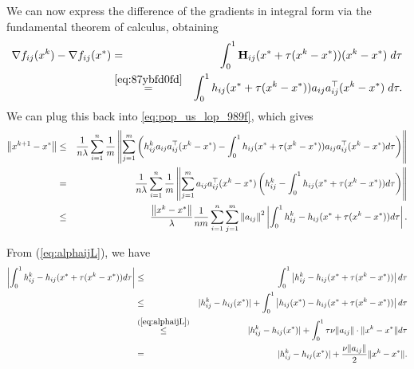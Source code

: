 \documentclass[12pt]{article}
\newcommand{\norm}[1]{\left\|#1\right\|}
\newcommand{\mH}{\mathbf{H}}
\begin{document}
We can now express the difference of the gradients in integral form via the fundamental theorem of calculus, obtaining 
\begin{eqnarray*} \nabla f_{ij}(x^k) - \nabla f_{ij}(x^*) &=&   \int_{0}^1 \mH_{ij} (x^* + \tau(x^k - x^*)) (x^k - x^*) \; d\tau \\
&\overset{\eqref{eq:87ybfd0fd}}{=} & \int_{0}^1 h_{ij}(x^* + \tau(x^k - x^*)) a_{ij}a_{ij}^\top  (x^k - x^*)\; d\tau .\end{eqnarray*}
We can plug this back into \eqref{eq:pop_us_lop_989f}, which gives
\begin{eqnarray}	
\norm{ x^{k+1} - x^* }	&\leq & 
 \frac{1}{n \lambda} \sum_{i=1}^n \frac{1}{m} \norm{  \sum_{j=1}^{m} \left(  h_{ij}^k a_{ij}a_{ij}^\top (x^k - x^*)  -  \int_{0}^1 h_{ij} (x^* + \tau(x^k - x^*))a_{ij}a_{ij}^\top (x^k - x^*)d\tau  \right)   } \notag \\ 
	&=& \frac{1}{n \lambda} \sum_{i=1}^n \frac{1}{m} \norm{  \sum_{j=1}^{m}  a_{ij}a_{ij}^\top (x^k - x^*) \left( h_{ij}^k - \int_{0}^1 h_{ij}(x^* + \tau(x^k - x^*))  d\tau \right) }\notag \\ 
	&\leq& \frac{ \norm{x^k - x^*}}{ \lambda} \frac{1}{nm} \sum_{i=1}^n \sum_{j=1}^{m} \norm{a_{ij}}^2 \left|   \int_{0}^1 h_{ij}^k - h_{ij}(x^* + \tau(x^k - x^*))  d\tau  \right|. \label{petrol-09809fd}
\end{eqnarray}

From (\ref{eq:alphaijL}), we have 
\begin{eqnarray}
	\left|   \int_{0}^1 h_{ij}^k - h_{ij}(x^* + \tau(x^k - x^*))  d\tau  \right| &\leq& \int_{0}^1 \left|  h_{ij}^k - h_{ij}(x^* + \tau(x^k - x^*))   \right| d\tau \notag \\
	&\leq& |h_{ij}^k - h_{ij}(x^*)| + \int_{0}^1 \left|  h_{ij}(x^*) -  h_{ij}(x^* + \tau(x^k - x^*))   \right| d \tau \notag \\ 
	&\overset{(\ref{eq:alphaijL})}{\leq}&  |h_{ij}^k - h_{ij}(x^*)| + \int_{0}^1 \tau \nu \|a_{ij}\| \cdot \|x^k - x^*\| d\tau  \notag \\ 
	&=&  |h_{ij}^k - h_{ij}(x^*)| + \frac{\nu \|a_{ij}\|}{2} \|x^k-x^*\|. \label{eq:olive-09u0hfdih}
\end{eqnarray}
\end{document}
